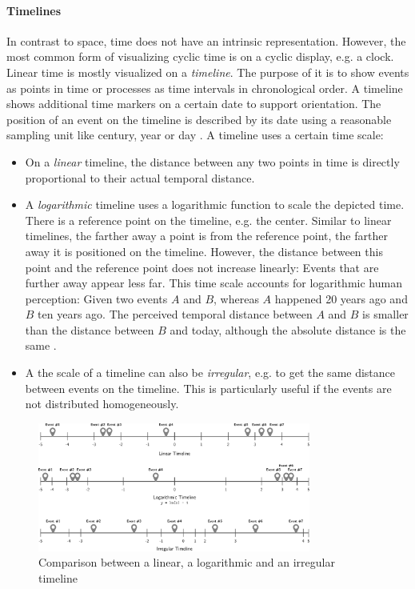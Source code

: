 
\paragraph{Timelines} %
\label{sub:timelines}

In contrast to space, time does not have an intrinsic representation. However, the most common form of visualizing cyclic time is on a cyclic display, e.g. a  clock. Linear time is mostly visualized on a \emph{timeline}. The purpose of it is to show events as points in time or processes as time intervals in chronological order. A timeline shows additional time markers on a certain date to support orientation. The position of an event on the timeline is described by its date using a reasonable sampling unit like century, year or day
\cite[p. 32]{Langran1989timeingis}.
A timeline uses a certain time scale:

\begin{itemize}
  \item On a \emph{linear} timeline, the distance between any two points in time is directly proportional to their actual temporal distance.
  \item A \emph{logarithmic} timeline uses a logarithmic function to scale the depicted time. There is a reference point on the timeline, e.g. the center. Similar to linear timelines, the farther away a point is from the reference point, the farther away it is positioned on the timeline. However, the distance between this point and the reference point does not increase linearly: Events that are further away appear less far. This time scale accounts for logarithmic human perception: Given two events $A$ and $B$, whereas $A$ happened 20 years ago and $B$ ten years ago. The perceived temporal distance between $A$ and $B$ is smaller than the distance between $B$ and today, although the absolute distance is the same
  \cite{logorlinear}.
  \item A the scale of a timeline can also be \emph{irregular}, e.g. to get the same distance between events on the timeline. This is particularly useful if the events are not distributed homogeneously.
\end{itemize}

\begin{figure}[ht]
  \centering
  \includegraphics[width=0.8\textwidth]{graphics/basics/hgis/timelines}
  \caption{Comparison between a linear, a logarithmic and an irregular timeline}
  \label{fig:timelines}
\end{figure}

